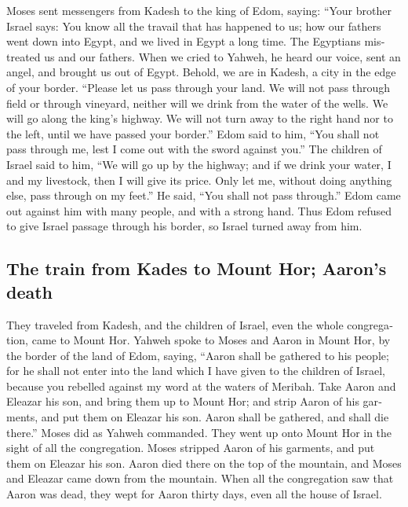\begin{paracol}{2}
\begin{otherlanguage}{english}
 Moses sent messengers from Kadesh to the king of Edom,
saying: ``Your brother Israel says: You know all the travail that has
happened to us;  how our fathers went down into Egypt,
and we lived in Egypt a long time. The Egyptians mistreated us and our
fathers.  When we cried to Yahweh, he heard our voice,
sent an angel, and brought us out of Egypt. Behold, we are in Kadesh, a
city in the edge of your border.  ``Please let us pass
through your land. We will not pass through field or through vineyard,
neither will we drink from the water of the wells. We will go along the
king's highway. We will not turn away to the right hand nor to the left,
until we have passed your border.''  Edom said to him,
``You shall not pass through me, lest I come out with the sword against
you.''  The children of Israel said to him, ``We will go
up by the highway; and if we drink your water, I and my livestock, then
I will give its price. Only let me, without doing anything else, pass
through on my feet.''  He said, ``You shall not pass
through.'' Edom came out against him with many people, and with a strong
hand.  Thus Edom refused to give Israel passage through
his border, so Israel turned away from him.

\hypertarget{the-train-from-kades-to-mount-hor-aarons-death}{%
\subsection{The train from Kades to Mount Hor; Aaron's
death}\label{the-train-from-kades-to-mount-hor-aarons-death}}

 They traveled from Kadesh, and the children of Israel,
even the whole congregation, came to Mount Hor.  Yahweh
spoke to Moses and Aaron in Mount Hor, by the border of the land of
Edom, saying,  ``Aaron shall be gathered to his people;
for he shall not enter into the land which I have given to the children
of Israel, because you rebelled against my word at the waters of
Meribah.  Take Aaron and Eleazar his son, and bring them
up to Mount Hor;  and strip Aaron of his garments, and
put them on Eleazar his son. Aaron shall be gathered, and shall die
there.''  Moses did as Yahweh commanded. They went up
onto Mount Hor in the sight of all the congregation. 
Moses stripped Aaron of his garments, and put them on Eleazar his son.
Aaron died there on the top of the mountain, and Moses and Eleazar came
down from the mountain.  When all the congregation saw
that Aaron was dead, they wept for Aaron thirty days, even all the house
of Israel.


\end{otherlanguage}
\end{paracol}
